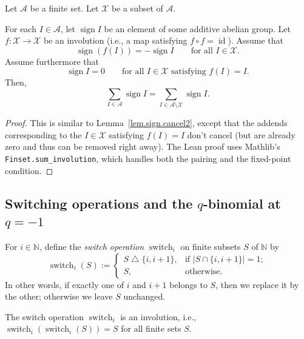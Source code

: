 \begin{lemma}
\label{lem.sign.cancel3}
\leantarget
\leanok
Let $\mathcal{A}$ be a finite set. Let $\mathcal{X}$ be a subset of
$\mathcal{A}$.

For each $I \in \mathcal{A}$, let $\operatorname{sign} I$ be an element
of some additive abelian group. Let
$f : \mathcal{X} \to \mathcal{X}$ be an involution (i.e., a map
satisfying $f \circ f = \operatorname{id}$). Assume that
\[
\operatorname{sign}(f(I)) = -\operatorname{sign} I
\qquad \text{for all } I \in \mathcal{X}.
\]
Assume furthermore that
\[
\operatorname{sign} I = 0
\qquad \text{for all } I \in \mathcal{X} \text{ satisfying } f(I) = I.
\]
Then,
\[
\sum_{I \in \mathcal{A}} \operatorname{sign} I
= \sum_{I \in \mathcal{A} \setminus \mathcal{X}} \operatorname{sign} I.
\]
\end{lemma}

\begin{proof}
This is similar to Lemma~\ref{lem.sign.cancel2}, except that the
addends corresponding to the $I \in \mathcal{X}$ satisfying $f(I) = I$
don't cancel (but are already zero and thus can be removed right away).
The Lean proof uses Mathlib's \texttt{Finset.sum\_involution}, which
handles both the pairing and the fixed-point condition.
\end{proof}

\subsection{Switching operations and the \texorpdfstring{$q$}{q}-binomial at \texorpdfstring{$q = -1$}{q = -1}}

\begin{definition}
\label{def.switch}
\leanhelper
\leanok
For $i \in \mathbb{N}$, define the \emph{switch operation}
$\operatorname{switch}_i$ on finite subsets $S$ of $\mathbb{N}$ by
\[
\operatorname{switch}_i(S) :=
\begin{cases}
S \bigtriangleup \{i, i+1\}, & \text{if } |S \cap \{i, i+1\}| = 1; \\
S, & \text{otherwise.}
\end{cases}
\]
In other words, if exactly one of $i$ and $i+1$ belongs to $S$,
then we replace it by the other; otherwise we leave $S$ unchanged.
\end{definition}

\begin{lemma}
\label{lem.switch_involution}
\leanhelper
\leanok
The switch operation $\operatorname{switch}_i$ is an involution, i.e.,
$\operatorname{switch}_i(\operatorname{switch}_i(S)) = S$ for all
finite sets $S$.
\end{lemma}

